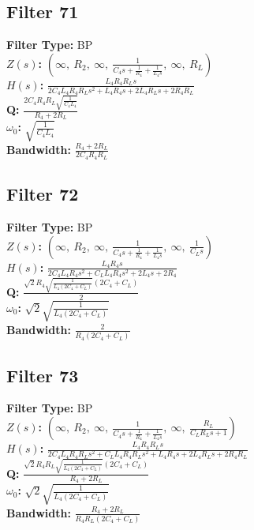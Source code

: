 \documentclass{article}
\begin{document}
\subsection*{Filter 71}
\textbf{Filter Type:} BP \\ 
\textbf{$Z(s)$:} $\left( \infty, \  R_{2}, \  \infty, \  \frac{1}{C_{4} s + \frac{1}{R_{4}} + \frac{1}{L_{4} s}}, \  \infty, \  R_{L}\right)$ \\ 
\textbf{$H(s)$:} $\frac{L_{4} R_{4} R_{L} s}{2 C_{4} L_{4} R_{4} R_{L} s^{2} + L_{4} R_{4} s + 2 L_{4} R_{L} s + 2 R_{4} R_{L}}$ \\ 
\textbf{Q:} $\frac{2 C_{4} R_{4} R_{L} \sqrt{\frac{1}{C_{4} L_{4}}}}{R_{4} + 2 R_{L}}$ \\ 
\textbf{$\omega_0$:} $\sqrt{\frac{1}{C_{4} L_{4}}}$ \\ 
\textbf{Bandwidth:} $\frac{R_{4} + 2 R_{L}}{2 C_{4} R_{4} R_{L}}$ \\ 
\subsection*{Filter 72}
\textbf{Filter Type:} BP \\ 
\textbf{$Z(s)$:} $\left( \infty, \  R_{2}, \  \infty, \  \frac{1}{C_{4} s + \frac{1}{R_{4}} + \frac{1}{L_{4} s}}, \  \infty, \  \frac{1}{C_{L} s}\right)$ \\ 
\textbf{$H(s)$:} $\frac{L_{4} R_{4} s}{2 C_{4} L_{4} R_{4} s^{2} + C_{L} L_{4} R_{4} s^{2} + 2 L_{4} s + 2 R_{4}}$ \\ 
\textbf{Q:} $\frac{\sqrt{2} R_{4} \sqrt{\frac{1}{L_{4} \left(2 C_{4} + C_{L}\right)}} \left(2 C_{4} + C_{L}\right)}{2}$ \\ 
\textbf{$\omega_0$:} $\sqrt{2} \sqrt{\frac{1}{L_{4} \left(2 C_{4} + C_{L}\right)}}$ \\ 
\textbf{Bandwidth:} $\frac{2}{R_{4} \left(2 C_{4} + C_{L}\right)}$ \\ 
\subsection*{Filter 73}
\textbf{Filter Type:} BP \\ 
\textbf{$Z(s)$:} $\left( \infty, \  R_{2}, \  \infty, \  \frac{1}{C_{4} s + \frac{1}{R_{4}} + \frac{1}{L_{4} s}}, \  \infty, \  \frac{R_{L}}{C_{L} R_{L} s + 1}\right)$ \\ 
\textbf{$H(s)$:} $\frac{L_{4} R_{4} R_{L} s}{2 C_{4} L_{4} R_{4} R_{L} s^{2} + C_{L} L_{4} R_{4} R_{L} s^{2} + L_{4} R_{4} s + 2 L_{4} R_{L} s + 2 R_{4} R_{L}}$ \\ 
\textbf{Q:} $\frac{\sqrt{2} R_{4} R_{L} \sqrt{\frac{1}{L_{4} \left(2 C_{4} + C_{L}\right)}} \left(2 C_{4} + C_{L}\right)}{R_{4} + 2 R_{L}}$ \\ 
\textbf{$\omega_0$:} $\sqrt{2} \sqrt{\frac{1}{L_{4} \left(2 C_{4} + C_{L}\right)}}$ \\ 
\textbf{Bandwidth:} $\frac{R_{4} + 2 R_{L}}{R_{4} R_{L} \left(2 C_{4} + C_{L}\right)}$ \\ 
\end{document}
